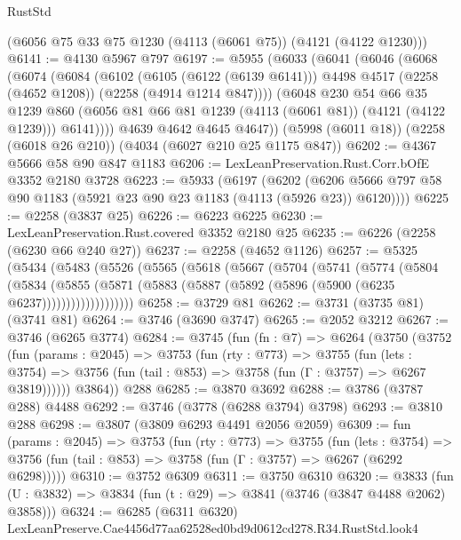 \begin{lexlean}{RustStd}
\begin{coremodule}
    (@6056 @75 @33 @75 @1230 (@4113 (@6061 @75)) (@4121 (@4122 @1230)))
@6141 := @4130 @5967 @797
@6197 := @5955
    (@6033
      (@6041
        (@6046
          (@6068
            (@6074
              (@6084
                (@6102
                  (@6105 (@6122 (@6139 @6141)))
                  @4498
                  @4517
                  (@2258 (@4652 @1208))
                  (@2258 (@4914 @1214 @847))))
              (@6048
                @230
                @54
                @66
                @35
                @1239
                @860
                (@6056 @81 @66 @81 @1239 (@4113 (@6061 @81)) (@4121 (@4122 @1239)))
                @6141))))
        @4639
        @4642
        @4645
        @4647))
    (@5998 (@6011 @18))
    (@2258 (@6018 @26 @210))
    (@4034 (@6027 @210 @25 @1175 @847))
@6202 := @4367 @5666 @58 @90 @847 @1183
@6206 := LexLeanPreservation.Rust.Corr.bOfE @3352 @2180 @3728
@6223 := @5933
    (@6197
      (@6202 (@6206 @5666 @797 @58 @90 @1183 (@5921 @23 @90 @23 @1183 (@4113 (@5926 @23)) @6120))))
@6225 := @2258 (@3837 @25)
@6226 := @6223 @6225
@6230 := LexLeanPreservation.Rust.covered @3352 @2180 @25
@6235 := @6226 (@2258 (@6230 @66 @240 @27))
@6237 := @2258 (@4652 @1126)
@6257 := @5325
    (@5434
      (@5483
        (@5526
          (@5565
            (@5618
              (@5667
                (@5704
                  (@5741
                    (@5774
                      (@5804
                        (@5834
                          (@5855
                            (@5871
                              (@5883 (@5887 (@5892 (@5896 (@5900 (@6235 @6237)))))))))))))))))))
@6258 := @3729 @81
@6262 := @3731 (@3735 @81) (@3741 @81)
@6264 := @3746 (@3690 @3747)
@6265 := @2052 @3212
@6267 := @3746 (@6265 @3774)
@6284 := @3745
    (fun (fn : @7) =>
    @6264
      (@3750
        (@3752
          (fun (params : @2045) =>
          @3753
            (fun (rty : @773) =>
            @3755
              (fun (lets : @3754) =>
              @3756 (fun (tail : @853) => @3758 (fun (Γ : @3757) => @6267 @3819))))))
        @3864))
    @288
@6285 := @3870 @3692
@6288 := @3786 (@3787 @288) @4488
@6292 := @3746 (@3778 (@6288 @3794) @3798)
@6293 := @3810 @288
@6298 := @3807 (@3809 @6293 @4491 @2056 @2059)
@6309 := fun (params : @2045) =>
  @3753
    (fun (rty : @773) =>
    @3755
      (fun (lets : @3754) =>
      @3756 (fun (tail : @853) => @3758 (fun (Γ : @3757) => @6267 (@6292 @6298)))))
@6310 := @3752 @6309
@6311 := @3750 @6310
@6320 := @3833 (fun (U : @3832) => @3834 (fun (t : @29) => @3841 (@3746 (@3847 @4488 @2062) @3858)))
@6324 := @6285 (@6311 @6320) LexLeanPreserve.Cae4456d77aa62528ed0bd9d0612cd278.R34.RustStd.look4

\end{coremodule}
\end{lexlean}
